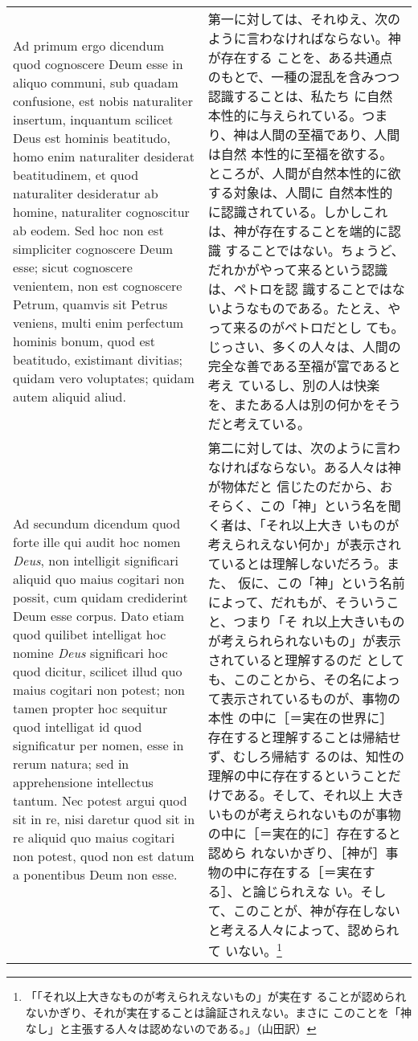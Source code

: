 \documentclass[10pt]{jsarticle}
\begin{document}
\begin{longtable}{p{21em}p{21em}}
\\

{\sc Ad primum ergo dicendum} quod cognoscere Deum esse in aliquo
communi, sub quadam confusione, est nobis naturaliter insertum,
inquantum scilicet Deus est hominis beatitudo, homo enim naturaliter
desiderat beatitudinem, et quod naturaliter desideratur ab homine,
naturaliter cognoscitur ab eodem. Sed hoc non est simpliciter
cognoscere Deum esse; sicut cognoscere venientem, non est cognoscere
Petrum, quamvis sit Petrus veniens, multi enim perfectum hominis
bonum, quod est beatitudo, existimant divitias; quidam vero
voluptates; quidam autem aliquid aliud.


&

第一に対しては、それゆえ、次のように言わなければならない。神が存在する
ことを、ある共通点のもとで、一種の混乱を含みつつ認識することは、私たち
に自然本性的に与えられている。つまり、神は人間の至福であり、人間は自然
本性的に至福を欲する。ところが、人間が自然本性的に欲する対象は、人間に
自然本性的に認識されている。しかしこれは、神が存在することを端的に認識
することではない。ちょうど、だれかがやって来るという認識は、ペトロを認
識することではないようなものである。たとえ、やって来るのがペトロだとし
ても。じっさい、多くの人々は、人間の完全な善である至福が富であると考え
ているし、別の人は快楽を、またある人は別の何かをそうだと考えている。

\\

{\sc Ad secundum dicendum} quod forte ille qui audit hoc nomen {\it
Deus}, non intelligit significari aliquid quo maius cogitari non
possit, cum quidam crediderint Deum esse corpus. Dato etiam quod
quilibet intelligat hoc nomine {\it Deus} significari hoc quod
dicitur, scilicet illud quo maius cogitari non potest; non tamen
propter hoc sequitur quod intelligat id quod significatur per nomen,
esse in rerum natura; sed in apprehensione intellectus tantum. Nec
potest argui quod sit in re, nisi daretur quod sit in re aliquid quo
maius cogitari non potest, quod non est datum a ponentibus Deum non
esse.


 &

第二に対しては、次のように言わなければならない。ある人々は神が物体だと
信じたのだから、おそらく、この「神」という名を聞く者は、「それ以上大き
いものが考えられえない何か」が表示されているとは理解しないだろう。また、
仮に、この「神」という名前によって、だれもが、そういうこと、つまり「そ
れ以上大きいものが考えられられないもの」が表示されていると理解するのだ
としても、このことから、その名によって表示されているものが、事物の本性
の中に［＝実在の世界に］存在すると理解することは帰結せず、むしろ帰結す
るのは、知性の理解の中に存在するということだけである。そして、それ以上
大きいものが考えられないものが事物の中に［＝実在的に］存在すると認めら
れないかぎり、［神が］事物の中に存在する［＝実在する］、と論じられえな
い。そして、このことが、神が存在しないと考える人々によって、認められて
いない。\footnote{「「それ以上大きなものが考えられえないもの」が実在す
ることが認められないかぎり、それが実在することは論証されえない。まさに
このことを「神なし」と主張する人々は認めないのである。」（山田訳）}




\end{longtable}
\end{document}
